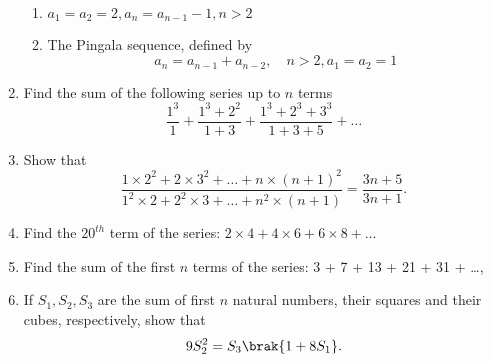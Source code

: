 \begin{enumerate}[label=\thesubsection.\arabic*,ref=\thesubsection.\theenumi]
\begin{enumerate}
\item $a_1 = a_2 = 2, a_n = a_{n-1}-1, n > 2$ 
\item The Pingala sequence, defined by $$a_n = a_{n-1}+a_{n-2}, \quad n>2,  a_1 = a_2=1$$ 
\end{enumerate}
\item Find the sum of the following series up to $n$ terms
$$\frac{1^3}{1}+\frac{1^3+2^2}{1+3}+\frac{1^3+2^3+3^3}{1+3+5}+\dots$$
\item Show that $$\frac{1 \times 2^2+ 2 \times 3^2+\dots+n \times (n+1)^2}{1^2 \times 2 + 2^2 \times 3 +\dots+n^2 \times (n+1)} = \frac{3n+5}{3n+1}.$$
\item Find the $20^{th}$ term of the series: $2 \times 4 + 4 \times 6 + 6 \times 8 + \dots  $ 
\item Find the sum of the first $n$ terms of the series: 3 + 7 + 13 + 21 + 31 + \dots, 
\item If $S_1, S_2, S_3$ are the sum of first $n$ natural numbers, their squares and their cubes, respectively, show that $$9 S_2^2 = S_3 \brak{1 + 8S_1}.$$
\end{enumerate}
